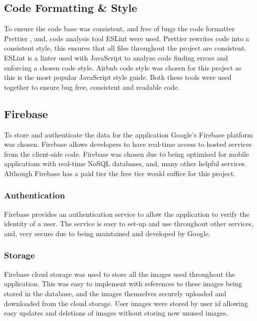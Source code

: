 \subsection{Code Formatting \& Style} \label{CodeF&S}
To ensure the code base was consistent, and free of bugs the code formatter Prettier \cite{prettier}, and, code analysis tool ESLint \cite{eslint} were used. Prettier rewrites code into a consistent style, this ensures that all files throughout the project are consistent. ESLint is a linter used with JavaScript to analyze code finding errors and enforcing a chosen code style. Airbnb \cite{airbnb} code style was chosen for this project as this is the most popular JavaScript style guide. Both these tools were used together to ensure bug free, consistent and readable code. 
\subsection{Firebase}
To store and authenticate the data for the application Google's Firebase \cite{firebase} platform was chosen. Firebase allows developers to have real-time access to hosted services from the client-side code. Firebase was chosen due to being optimised for mobile applications with real-time NoSQL \cite{nosql} databases, and, many other helpful services. Although Firebase has a paid tier the free tier would suffice for this project.     
\subsubsection{Authentication}
Firebase provides an authentication service to allow the application to verify the identity of a user. The service is easy to set-up and use throughout other services, and, very secure due to being maintained and developed by Google.
\subsubsection{Storage}
Firebase cloud storage was used to store all the images used throughout the application. This was easy to implement with references to these images being stored in the database, and the images themselves securely uploaded and downloaded from the cloud storage. User images were stored by user id allowing easy updates and deletions of images without storing now unused images.  
